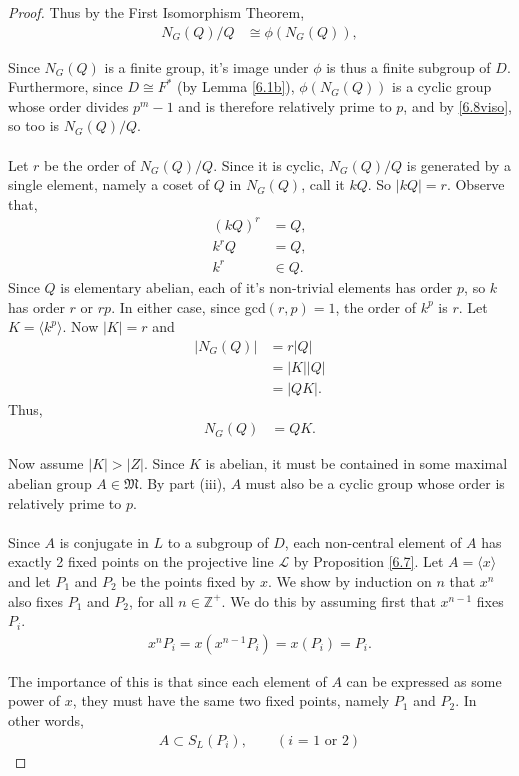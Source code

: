 \documentclass[a4paper , 11pt]{book}
\theoremstyle{definition}
\theoremstyle{remark}
\begin{document}
\begin{proof}
Thus by the First Isomorphism Theorem,
\begin{align}\label{6.8viso} N_G(Q) / Q &\cong \phi(N_G(Q)),
\end{align}

Since $N_G(Q)$ is a finite group, it's image under $\phi$ is thus a finite subgroup of $D$. Furthermore, since $D \cong F^*$ (by Lemma \ref{6.1b}), $\phi(N_G(Q))$ is a cyclic group whose order divides $p^m-1$ and is therefore relatively prime to $p$, and by \eqref{6.8viso}, so too is $N_G(Q) / Q$. \\
\\
Let $r$ be the order of $N_G(Q) / Q$. Since it is cyclic, $N_G(Q)/Q$ is generated by a single element, namely a coset of $Q$ in $N_G(Q)$, call it $kQ$. So $|kQ| = r$. Observe that,
\begin{align*} (kQ)^r &= Q,
\\ k^rQ &= Q,
\\ k^r &\in Q.
\end{align*}
Since $Q$ is elementary abelian, each of it's non-trivial elements has order $p$, so $k$ has order $r$ or $rp$. In either case, since gcd$(r,p)=1$, the order of $k^p$ is $r$. Let $K = \langle k^p \rangle$. Now $|K| = r$ and
\begin{align*} |N_G(Q)| &= r|Q|
\\ &= |K||Q|
\\ &= |QK|. \tag{since $Q \cap K = I_G$} 
\end{align*}
Thus,
\begin{align}\label{QK} N_G(Q) &= QK.
\end{align}

Now assume $|K| > |Z|$. Since $K$ is abelian, it must be contained in some maximal abelian group $A \in \mathfrak{M}$. By part (iii), $A$ must also be a cyclic group whose order is relatively prime to $p$. \\
\\
Since $A$ is conjugate in $L$ to a subgroup of $D$, each non-central element of $A$ has exactly 2 fixed points on the projective line $\mathscr{L}$ by Proposition \ref{6.7}. Let $A = \langle x \rangle$ and let $P_1$ and $P_2$ be the points fixed by $x$. We show by induction on $n$ that $x^n$ also fixes $P_1$ and $P_2$, for all $n \in \mathbb{Z^+}$. We do this by assuming first that $x^{n-1}$ fixes $P_i$.
\begin{align*} x^n P_i = x(x^{n-1} P_i) = x (P_i) = P_i.
\end{align*}

The importance of this is that since each element of $A$ can be expressed as some power of $x$, they must have the same two fixed points, namely $P_1$ and $P_2$. In other words, 
\begin{align}\label{stab} A \subset S_L(P_i), \qquad (\text{$i$ = 1 or 2})
\end{align}


\end{proof}
\end{document}
